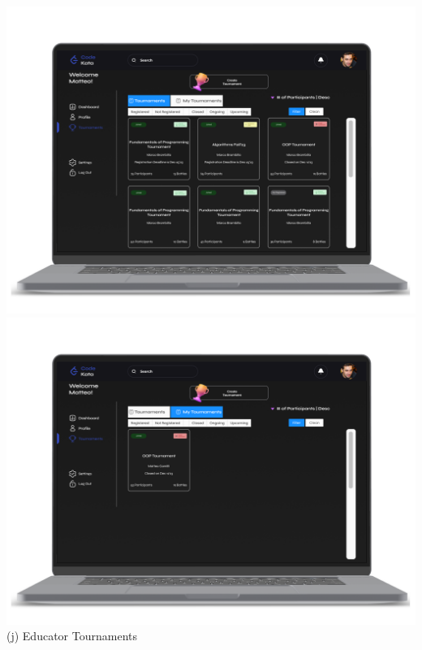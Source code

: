 \begin{center}
\includegraphics[scale=0.13]{Images/ui-ux/educator_tournaments/educator_tournaments_1.png}
\includegraphics[scale=0.13]{Images/ui-ux/educator_tournaments/educator_tournaments_2.png}
        (j) Educator Tournaments
\end{center}
